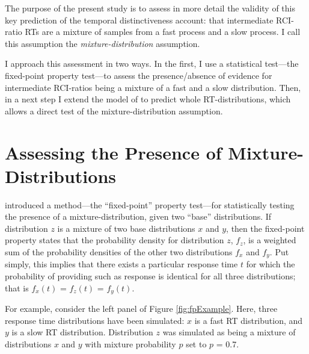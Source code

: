 \documentclass[a4paper, jou, natbib]{apa6}
\begin{document}
The purpose of the present study is to assess in more detail the validity of this key prediction of the temporal distinctiveness account: that intermediate RCI-ratio RTs are a mixture of samples from a fast process and a slow process. I call this assumption the \emph{mixture-distribution} assumption. 

I approach this assessment in two ways. In the first, I use a statistical test---the fixed-point property test---to assess the presence/absence of evidence for intermediate RCI-ratios being a mixture of a fast and a slow distribution. Then, in a next step I extend the model of \cite{Grange2015} to predict whole RT-distributions, which allows a direct test of the mixture-distribution assumption.

\section{Assessing the Presence of Mixture-Distributions}
\cite{VanMaanen2014} introduced a method---the ``fixed-point'' property test---for statistically testing the presence of a mixture-distribution, given two ``base'' distributions. If distribution $z$ is a mixture of two base distributions $x$ and $y$, then the fixed-point property states that the probability density for distribution $z$, $f_{z}$, is a weighted sum of the probability densities of the other two distributions $f_{x}$ and $f_{y}$. Put simply, this implies that there exists a particular response time $t$ for which the probability of providing such as response is identical for all three distributions; that is $f_{x}(t)$ = $f_{z}(t)$ = $f_{y}(t)$. 

For example, consider the left panel of Figure \ref{fig:fpExample}. Here, three response time distributions have been simulated: $x$ is a fast RT distribution, and $y$ is a slow RT distribution. Distribution $z$ was simulated as being a mixture of distributions $x$ and $y$ with mixture probability $p$ set to $p$ = 0.7.  
\end{document}
